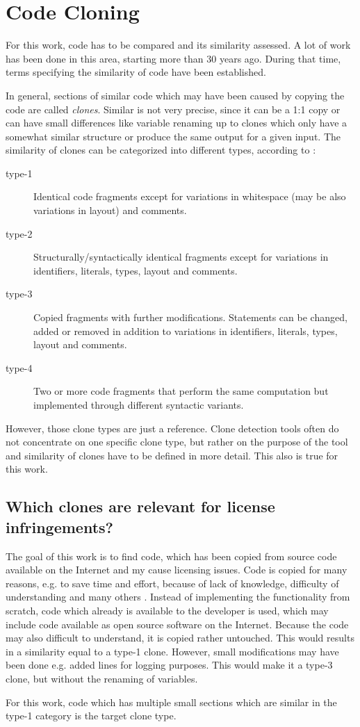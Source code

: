\section{Code Cloning}
For this work, code has to be compared and its similarity assessed.
A lot of work has been done in this area, starting more than 30 years ago\cite{lancaster2004comparison}.
During that time, terms specifying the similarity of code have been established.

In general, sections of similar code which may have been caused by copying the code are called \textit{clones}.
Similar is not very precise, since it can be a 1:1 copy or can have small differences like variable renaming up to clones which only have a somewhat similar structure or produce the same output for a given input.
The similarity of clones can be categorized into different types, according to \cite{roy2007survey}:

\begin{description}
	\item[type-1] Identical code fragments except for variations in whitespace (may be also variations in layout) and comments.
	\item[type-2] Structurally/syntactically identical fragments except for variations in identifiers, literals, types, layout and comments.
	\item[type-3] Copied fragments with further modifications. Statements can be changed, added or removed in addition to variations in identifiers, literals, types, layout and comments.
	\item[type-4] Two or more code fragments that perform the same computation but implemented through different syntactic variants.
\end{description}

However, those clone types are just a reference.
Clone detection tools often do not concentrate on one specific clone type, but rather on the purpose of the tool and similarity of clones have to be defined in more detail.
This also is true for this work.

\subsection*{Which clones are relevant for license infringements?}
The goal of this work is to find code, which has been copied from source code available on the Internet and my cause licensing issues.
Code is copied for many reasons, e.g. to save time and effort, because of lack of knowledge, difficulty of understanding and many others \cite{roy2007survey}.
Instead of implementing the functionality from scratch, code which already is available to the developer is used, which may include code available as open source software on the Internet.
Because the code may also difficult to understand, it is copied rather untouched.
This would results in a similarity equal to a type-1 clone.
However, small modifications may have been done e.g. added lines for logging purposes.
This would make it a type-3 clone, but without the renaming of variables.

For this work, code which has multiple small sections which are similar in the type-1 category is the target clone type.

